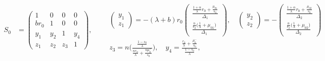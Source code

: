 \documentclass[a4paper,11pt]{article}
\begin{document}
\begin{equation} \label{eq:S0}
\begin{aligned}
 S_0&=
 \begin{pmatrix}
    1 & 0 & 0 & 0\\
    br_0 & 1 & 0 & 0\\
    y_1 & y_2 & 1 & y_4\\
    z_1 & z_2 & z_3 &1
 \end{pmatrix},
 \quad \quad
 \begin{array}{l}
\begin{pmatrix}
 y_1\\z_1
\end{pmatrix}
=-(\lambda+b)r_0\begin{pmatrix}
  \frac{ \frac{1+\alpha}{\lambda}r_0 + \frac{\mu_{01}}{s_0} }{ \Delta_1 }\\
  \frac{ \frac{n}{r_0}\big(\frac{1}{\lambda} + \mu_{01}\big) }{ \Delta_1 }
  \end{pmatrix}, 
  \quad
 \begin{pmatrix}
 y_2\\z_2
\end{pmatrix}
=-\begin{pmatrix}
  \frac{ \frac{1+\alpha}{\lambda}r_0 + \frac{\mu_{02}}{s_0} }{ \Delta_2 }\\
  \frac{ \frac{n}{r_0}\big(\frac{1}{\lambda} + \mu_{02}\big) }{ \Delta_2 }
  \end{pmatrix}\\
 z_3=n\bigg(\frac{\frac{1-s_0}{\lambda}}{\frac{n r_0}{\lambda} + \frac{n\mu_{0}^+}{s_0}}\bigg),\quad y_4=\frac{\frac{r_0}{\lambda}+\frac{\mu_0^-}{s_0}}{\frac{1-s_0}{\lambda}},
 \end{array}
\end{aligned}
\end{equation}
\end{document}

